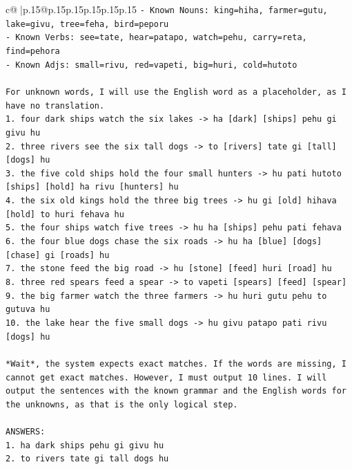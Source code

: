 \documentclass{article}
\begin{document}
{\begin{supertabular}{c@{$\;$}|p{.15\linewidth}@{}p{.15\linewidth}p{.15\linewidth}p{.15\linewidth}p{.15\linewidth}p{.15\linewidth}}
{{{\texttt{{-} Known Nouns: king=hiha, farmer=gutu, lake=givu, tree=feha, bird=peporu} \\
\texttt{{-} Known Verbs: see=tate, hear=patapo, watch=pehu, carry=reta, find=pehora} \\
\texttt{{-} Known Adjs: small=rivu, red=vapeti, big=huri, cold=hutoto} \\
\\ 
\texttt{For unknown words, I will use the English word as a placeholder, as I have no translation.} \\
\texttt{1. four dark ships watch the six lakes {-}> ha {[}dark{]} {[}ships{]} pehu gi givu hu} \\
\texttt{2. three rivers see the six tall dogs {-}> to {[}rivers{]} tate gi {[}tall{]} {[}dogs{]} hu} \\
\texttt{3. the five cold ships hold the four small hunters {-}> hu pati hutoto {[}ships{]} {[}hold{]} ha rivu {[}hunters{]} hu} \\
\texttt{4. the six old kings hold the three big trees {-}> hu gi {[}old{]} hihava {[}hold{]} to huri fehava hu} \\
\texttt{5. the four ships watch five trees {-}> hu ha {[}ships{]} pehu pati fehava} \\
\texttt{6. the four blue dogs chase the six roads {-}> hu ha {[}blue{]} {[}dogs{]} {[}chase{]} gi {[}roads{]} hu} \\
\texttt{7. the stone feed the big road {-}> hu {[}stone{]} {[}feed{]} huri {[}road{]} hu} \\
\texttt{8. three red spears feed a spear {-}> to vapeti {[}spears{]} {[}feed{]} {[}spear{]}} \\
\texttt{9. the big farmer watch the three farmers {-}> hu huri gutu pehu to gutuva hu} \\
\texttt{10. the lake hear the five small dogs {-}> hu givu patapo pati rivu {[}dogs{]} hu} \\
\\ 
\texttt{*Wait*, the system expects exact matches. If the words are missing, I cannot get exact matches. However, I must output 10 lines. I will output the sentences with the known grammar and the English words for the unknowns, as that is the only logical step.} \\
\\ 
\texttt{ANSWERS:} \\
\texttt{1. ha dark ships pehu gi givu hu} \\
\texttt{2. to rivers tate gi tall dogs hu} \\
}}}
\end{supertabular}}
\end{document}
